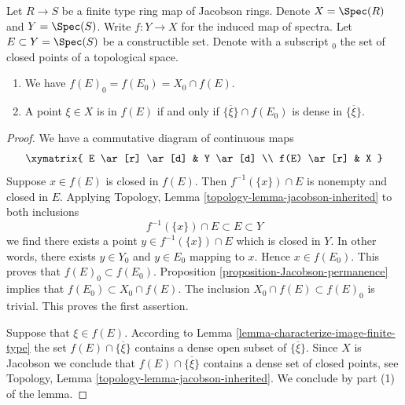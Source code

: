 \begin{lemma}
\label{lemma-image-finite-type-map-Jacobson-rings}
Let $R \to S$ be a finite type ring map of Jacobson rings.
Denote $X = \Spec(R)$ and $Y = \Spec(S)$.
Write $f : Y \to X$ for the induced
map of spectra. Let $E \subset Y = \Spec(S)$ be a
constructible set. Denote with a subscript ${}_0$ the set
of closed points of a topological space.
\begin{enumerate}
\item We have $f(E)_0 = f(E_0) = X_0 \cap f(E)$.
\item A point $\xi \in X$ is in $f(E)$ if and only if
$\overline{\{\xi\}} \cap f(E_0)$ is dense in $\overline{\{\xi\}}$.
\end{enumerate}
\end{lemma}

\begin{proof}
We have a commutative diagram of continuous maps
$$
\xymatrix{
E \ar[r] \ar[d] & Y \ar[d] \\
f(E) \ar[r] & X
}
$$
Suppose $x \in f(E)$ is closed in $f(E)$. Then $f^{-1}(\{x\})\cap E$
is nonempty and closed in $E$. Applying
Topology, Lemma \ref{topology-lemma-jacobson-inherited}
to both inclusions
$$
f^{-1}(\{x\}) \cap E \subset E \subset Y
$$
we find there exists a point $y \in f^{-1}(\{x\}) \cap E$ which is
closed in $Y$. In other words, there exists $y \in Y_0$ and $y \in E_0$
mapping to $x$. Hence $x \in f(E_0)$.
This proves that $f(E)_0 \subset f(E_0)$.
Proposition \ref{proposition-Jacobson-permanence} implies that
$f(E_0) \subset X_0 \cap f(E)$. The inclusion
$X_0 \cap f(E) \subset f(E)_0$ is trivial. This proves the
first assertion.

\medskip\noindent
Suppose that $\xi \in f(E)$. According to
Lemma \ref{lemma-characterize-image-finite-type}
the set $f(E) \cap \overline{\{\xi\}}$ contains a dense
open subset of $\overline{\{\xi\}}$. Since $X$ is Jacobson
we conclude that $f(E) \cap \overline{\{\xi\}}$ contains a
dense set of closed points, see Topology,
Lemma \ref{topology-lemma-jacobson-inherited}.
We conclude by part (1) of the lemma.


\end{proof}
